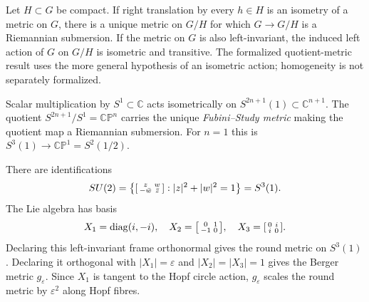 \begin{remark}
  \label{rem:pet-ch1-quotient-submersion}
  \leanok
  Let $H\subset G$ be compact. If right translation by every $h\in H$ is an
  isometry of a metric on $G$, there is a unique metric on $G/H$ for which
  $G\to G/H$ is a Riemannian submersion. If the metric on $G$ is also
  left-invariant, the induced left action of $G$ on $G/H$ is isometric and
  transitive. The formalized quotient-metric result uses the more general
  hypothesis of an isometric action; homogeneity is not separately formalized.
\end{remark}

\begin{example}
  \label{ex:pet-ch1-fubini-study}
  \leanok
  Scalar multiplication by $S^1\subset\mathbb{C}$ acts isometrically on
  $S^{2n+1}(1)\subset\mathbb{C}^{n+1}$. The quotient
  $S^{2n+1}/S^1=\mathbb{CP}^n$ carries the unique \emph{Fubini--Study metric}
  making the quotient map a Riemannian submersion. For $n=1$ this is
  $S^3(1)\to\mathbb{CP}^1=S^2(1/2)$.
\end{example}

\begin{example}
  \label{ex:pet-ch1-su2-berger}
  \leanok
  There are identifications
  \[
    SU(2)=\left\{\begin{bsmallmatrix}z&w\\-\bar w&\bar z\end{bsmallmatrix}
      :|z|^2+|w|^2=1\right\}=S^3(1).
  \]
  The Lie algebra has basis
  \[
    X_1=\operatorname{diag}(i,-i),\quad
    X_2=\begin{bsmallmatrix}0&1\\-1&0\end{bsmallmatrix},\quad
    X_3=\begin{bsmallmatrix}0&i\\i&0\end{bsmallmatrix}.
  \]
  Declaring this left-invariant frame orthonormal gives the round metric on
  $S^3(1)$. Declaring it orthogonal with
  $|X_1|=\varepsilon$ and $|X_2|=|X_3|=1$ gives the Berger metric
  $g_\varepsilon$. Since $X_1$ is tangent to the Hopf circle action,
  $g_\varepsilon$ scales the round metric by $\varepsilon^2$ along Hopf fibres.
\end{example}

